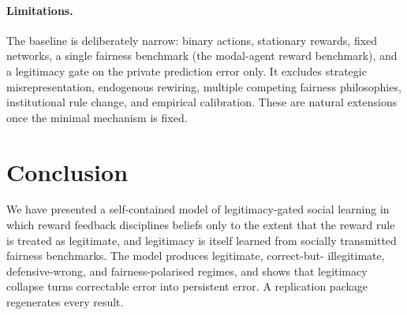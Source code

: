 \documentclass[11pt]{article}
\newcommand{\1}{\mathbf{1}}
\begin{document}
\paragraph{Limitations.}
The baseline is deliberately narrow: binary actions, stationary rewards, fixed
networks, a single fairness benchmark (the modal-agent reward benchmark), and a
legitimacy gate on the private prediction error only. It excludes strategic
misrepresentation, endogenous rewiring, multiple competing fairness philosophies,
institutional rule change, and empirical calibration. These are natural
extensions once the minimal mechanism is fixed.

\section{Conclusion}
We have presented a self-contained model of legitimacy-gated social learning in
which reward feedback disciplines beliefs only to the extent that the reward rule
is treated as legitimate, and legitimacy is itself learned from socially
transmitted fairness benchmarks. The model produces legitimate, correct-but-
illegitimate, defensive-wrong, and fairness-polarised regimes, and shows that
legitimacy collapse turns correctable error into persistent error. A replication
package regenerates every result.
\end{document}
